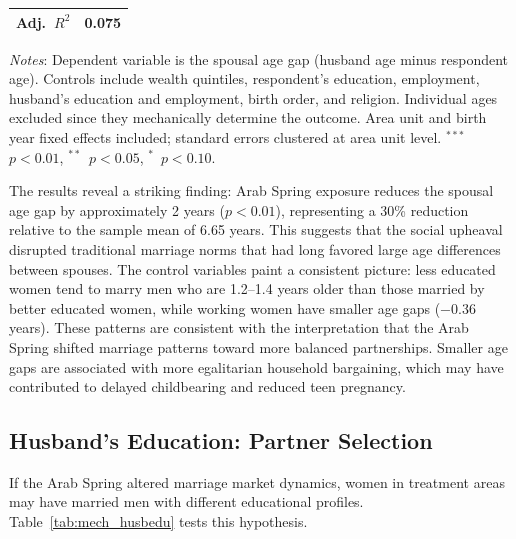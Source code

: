 \documentclass[12pt,a4paper]{article}
\begin{document}
\begin{table}[H]
\begin{threeparttable}
\begin{tabular}{@{}lc@{}}
Adj.\ $R^2$  & 0.075 \\
\bottomrule
\end{tabular}
\begin{tablenotes}[flushleft]
\footnotesize
\item \textit{Notes}: Dependent variable is the spousal age gap (husband age minus respondent age). Controls include wealth quintiles, respondent's education, employment, husband's education and employment, birth order, and religion. Individual ages excluded since they mechanically determine the outcome. Area unit and birth year fixed effects included; standard errors clustered at area unit level. $^{***}$~$p<0.01$, $^{**}$~$p<0.05$, $^{*}$~$p<0.10$.
\end{tablenotes}
\end{threeparttable}
\end{table}

\noindent The results reveal a striking finding: Arab Spring exposure reduces the spousal age gap by approximately 2 years ($p<0.01$), representing a 30\% reduction relative to the sample mean of 6.65 years. This suggests that the social upheaval disrupted traditional marriage norms that had long favored large age differences between spouses. The control variables paint a consistent picture: less educated women tend to marry men who are 1.2--1.4 years older than those married by better educated women, while working women have smaller age gaps ($-$0.36 years). These patterns are consistent with the interpretation that the Arab Spring shifted marriage patterns toward more balanced partnerships. Smaller age gaps are associated with more egalitarian household bargaining, which may have contributed to delayed childbearing and reduced teen pregnancy.
\vspace{0.25cm}

\subsection{Husband's Education: Partner Selection}

If the Arab Spring altered marriage market dynamics, women in treatment areas may have married men with different educational profiles. Table~\ref{tab:mech_husbedu} tests this hypothesis.
\vspace{0.25cm}
\end{document}
